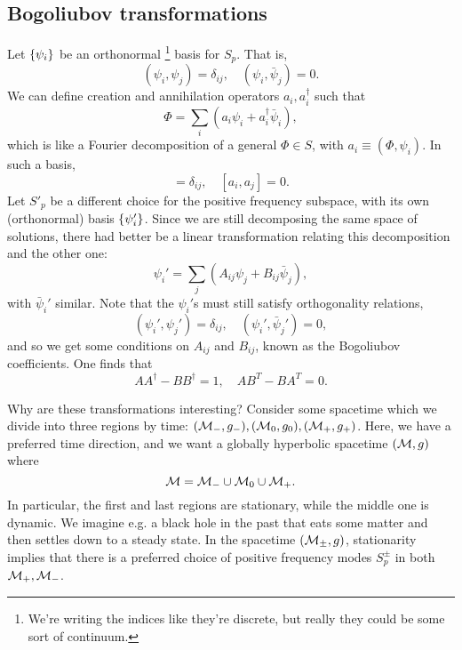 \subsection*{Bogoliubov transformations}
Let $\{\psi_i\}$ be an orthonormal%
    \footnote{We're writing the indices like they're discrete, but really they could be some sort of continuum.}
basis for $S_p$. That is,
\begin{equation}
    (\psi_i, \psi_j) = \delta_{ij}, \quad (\psi_i, \bar \psi_j)=0.
\end{equation}
We can define creation and annihilation operators $a_i,a_i^\dagger$ such that
\begin{equation}
    \Phi = \sum_i (a_i \psi_i + a_i^\dagger \bar \psi_i),
\end{equation}
which is like a Fourier decomposition of a general $\Phi\in S$, with $a_i \equiv (\Phi,\psi_i)$. In such a basis,
\begin{equation}
    [a_i, a_j^\dagger] = \delta_{ij},\quad [a_i,a_j]=0.
\end{equation}
Let $S'_p$ be a different choice for the positive frequency subspace, with its own (orthonormal) basis $\{\psi_i'\}$. Since we are still decomposing the same space of solutions, there had better be a linear transformation relating this decomposition and the other one:
\begin{equation}
     \psi_i' = \sum_j (A_{ij} \psi_j +B_{ij} \bar \psi_j),
\end{equation}
with $\bar \psi_i'$ similar. Note that the $\psi_i'$s must still satisfy orthogonality relations,
\begin{equation}
    (\psi_i', \psi_j')=\delta_{ij},\quad (\psi_i',\bar \psi_j')=0,
\end{equation}
and so we get some conditions on $A_{ij}$ and $B_{ij}$, known as the Bogoliubov coefficients. One finds that
\begin{equation}
     A A^\dagger - B B^\dagger =1 , \quad A B^T - BA^T=0.
\end{equation}

Why are these transformations interesting? Consider some spacetime which we divide into three regions by time: $(\mathcal{M}_-,g_-),(\mathcal{M}_0,g_0),(\mathcal{M}_+,g_+)$. Here, we have a preferred time direction, and we want a globally hyperbolic spacetime $(\mathcal{M},g)$ where
\begin{equation}
     \mathcal{M} = \mathcal{M}_- \cup \mathcal{M}_0 \cup \mathcal{M}_+.
\end{equation}
In particular, the first and last regions are stationary, while the middle one is dynamic. We imagine e.g. a black hole in the past that eats some matter and then settles down to a steady state. In the spacetime $(\mathcal{M}_\pm,g)$, stationarity implies that there is a preferred choice of positive frequency modes $S^\pm_p$ in both $\mathcal{M}_+,\mathcal{M}_-$.

